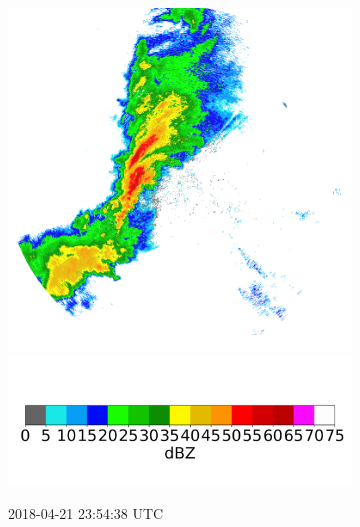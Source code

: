 \begin{figure}[ht]
\begin{subfigure}[b]{0.3\textwidth}
		\includegraphics[width=\textwidth]{./thesis_code/plots/midlothian.tx-20180421-235438-ref.png}
		\includegraphics[width=\textwidth]{./thesis_code/plots/dfw_colormap.png}
		\caption{2018-04-21 23:54:38 UTC}
		\label{fig:bestmodel_translation5}
	\end{subfigure}
	\begin{subfigure}[b]{0.3\textwidth}

\end{subfigure}
\end{figure}
